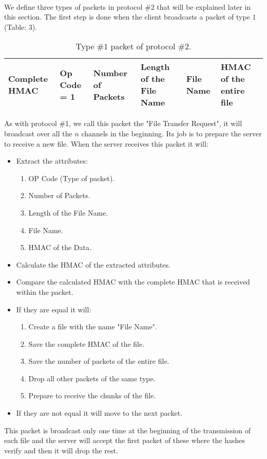 \documentclass[main.tex]{subfiles}
\begin{document}
\paragraph{}
We define three types of packets in protocol \#2 that will be explained later in this section. The first step is done when the client broadcasts a packet of type $1$ (Table: 3).\\
\begin{table*}[!h]
\begin{center}
\begin{tabu} to 1.1\textwidth { | X[c] | X[c]  | X[c]  | X[c]  | X[c]  | X[c] | }
 \hline
Complete HMAC & Op Code = 1 & Number of Packets & Length of the File Name & File Name& HMAC of the entire file\\
\hline
\end{tabu}
\caption{Type \#$1$ packet of protocol \#$2$.}
    \label{tab:table$3$}
\end{center}
\end{table*}

As with protocol \#1, we call this packet the "File Transfer Request", it will broadcast over all the $n$ channels in the beginning. Its job is to prepare the server to receive a new file. When the server receives this packet it will: 
\begin{itemize}
\item Extract the attributes:
\begin{enumerate}
\item OP Code (Type of packet).
\item Number of Packets.
\item Length of the File Name.
\item File Name.
\item HMAC of the Data.
\end{enumerate}
\item Calculate the HMAC of the extracted attributes.
\item Compare the calculated HMAC with the complete HMAC that is received within the packet.
\item If they are equal it will:
\begin{enumerate}
\item Create a file with the name "File Name".
\item Save the complete HMAC of the file.
\item Save the number of packets of the entire file.
\item Drop all other packets of the same type.
\item Prepare to receive the chunks of the file.
\end{enumerate}
\item If they are not equal it will move to the next packet.
\end{itemize} 
This packet is broadcast only one time at the beginning of the transmission of each file and the server will accept the first packet of these where the hashes verify and then it will drop the rest.
\end{document}
